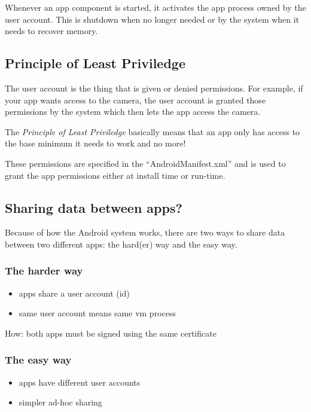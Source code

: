 \documentclass[12pt,notitlepage]{article}
\begin{document}
Whenever an app component is started, it activates the app process owned by the
user account. This is shutdown when no longer needed or by the system when it
needs to recover memory.

\subsection{Principle of Least Priviledge}

The user account is the thing that is given or denied permissions. For example,
if your app wants access to the camera, the user account is granted those
permissions by the system which then lets the app access the camera.

The \emph{Principle of Least Priviledge} basically means that an app only has
access to the base minimum it needs to work and no more!

These permissions are specified in the ``AndroidManifest.xml'' and is used to
grant the app permissions either at install time or run-time.

\subsection{Sharing data between apps?}

Because of how the Android system works, there are two ways to share data
between two different apps: the hard(er) way and the easy way.

\subsubsection{The harder way}
\begin{itemize}
    \item apps share a user account (id)
    \item same user account means same vm process
\end{itemize}

How: both apps must be signed using the same certificate

\subsubsection{The easy way}
\begin{itemize}
    \item apps have different user accounts
    \item simpler ad-hoc sharing
\end{itemize}
\end{document}
